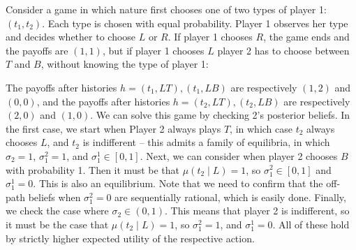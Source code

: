 \documentclass[10pt]{article}
\begin{document}
\begin{example}
	Consider a game in which nature first chooses one of two types of player 1: $(t_1,t_2)$. Each type is chosen with equal probability. Player 1 observes her type and decides whether to choose $L$ or $R$. If player 1 chooses $R$, the game ends and the payoffs are $(1,1)$, but if player 1 chooses $L$ player 2 has to choose between $T$ and $B$, without knowing the type of player 1:
	
	\begin{figure}[H]
	\centering
	\end{figure}
	
	The payoffs after histories $h = (t_1,LT),(t_1,LB)$ are respectively $(1,2)$ and $(0,0)$, and the payoffs after histories $h = (t_2,LT),(t_2,LB)$ are respectively $(2,0)$ and $(1,0)$. We can solve this game by checking 2's posterior beliefs. In the first case, we start when Player 2 always plays $T$, in which case $t_2$ always chooses $L$, and $t_2$ is indifferent -- this admits a family of equilibria, in which $\sigma_2 = 1$, $\sigma_1^2 = 1$, and $\sigma_1^1 \in [0,1]$. Next, we can consider when player 2 chooses $B$ with probability 1. Then it must be that $\mu(t_2 \mid L) = 1$, so $\sigma_1^2 \in [0,1]$ and $\sigma_1^1 = 0$. This is also an equilibrium. Note that we need to confirm that the off-path beliefs when $\sigma_1^2 = 0$ are sequentially rational, which is easily done. Finally, we check the case where $\sigma_2 \in (0,1)$. This means that player 2 is indifferent, so it must be the case that $\mu(t_2 \mid L) = 1$, so $\sigma_1^2 = 1$, and $\sigma_1^1 = 0$. All of these hold by strictly higher expected utility of the respective action. 
\end{example}
\end{document}
